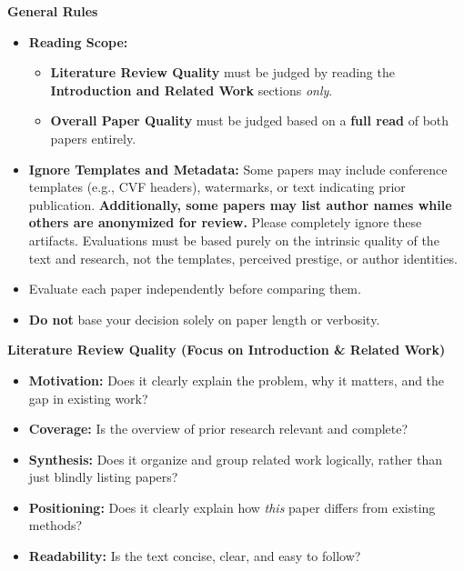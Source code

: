 \textbf{General Rules}
\vspace{0.5em}
\begin{itemize}
    \item \textbf{Reading Scope:} 
    \begin{itemize}
        \item \textbf{Literature Review Quality} must be judged by reading the \textbf{Introduction and Related Work} sections \textit{only}.
        \item \textbf{Overall Paper Quality} must be judged based on a \textbf{full read} of both papers entirely.
    \end{itemize}
    \item \textbf{Ignore Templates and Metadata:} Some papers may include conference templates (e.g., CVF headers), watermarks, or text indicating prior publication. \textbf{Additionally, some papers may list author names while others are anonymized for review.} Please completely ignore these artifacts. Evaluations must be based purely on the intrinsic quality of the text and research, not the templates, perceived prestige, or author identities.
    \item Evaluate each paper independently before comparing them.
    \item \textbf{Do not} base your decision solely on paper length or verbosity.
\end{itemize}

\vspace{1em}
\noindent\textbf{Literature Review Quality (Focus on Introduction \& Related Work)}
\vspace{0.5em}
\begin{itemize}
    \item \textbf{Motivation:} Does it clearly explain the problem, why it matters, and the gap in existing work?
    \item \textbf{Coverage:} Is the overview of prior research relevant and complete?
    \item \textbf{Synthesis:} Does it organize and group related work logically, rather than just blindly listing papers?
    \item \textbf{Positioning:} Does it clearly explain how \textit{this} paper differs from existing methods?
    \item \textbf{Readability:} Is the text concise, clear, and easy to follow?
\end{itemize}

